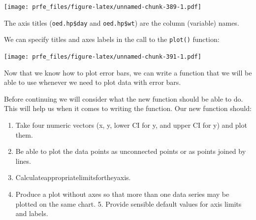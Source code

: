 \documentclass[12pt,]{book}
\newenvironment{Shaded}{\begin{snugshade}}{\end{snugshade}}
\newcommand{\KeywordTok}[1]{\textcolor[rgb]{0.13,0.29,0.53}{\textbf{#1}}}
\newcommand{\DataTypeTok}[1]{\textcolor[rgb]{0.13,0.29,0.53}{#1}}
\newcommand{\DecValTok}[1]{\textcolor[rgb]{0.00,0.00,0.81}{#1}}
\newcommand{\FloatTok}[1]{\textcolor[rgb]{0.00,0.00,0.81}{#1}}
\newcommand{\StringTok}[1]{\textcolor[rgb]{0.31,0.60,0.02}{#1}}
\newcommand{\OperatorTok}[1]{\textcolor[rgb]{0.81,0.36,0.00}{\textbf{#1}}}
\newcommand{\NormalTok}[1]{#1}
\theoremstyle{definition}
\theoremstyle{definition}
\theoremstyle{definition}
\theoremstyle{remark}
\begin{document}
\texttt{[image: prfe\_files/figure-latex/unnamed-chunk-389-1.pdf]}

The axis titles (\texttt{oed.hp\$day} and \texttt{oed.hp\$wt}) are the
column (variable) names.

We can specify titles and axes labels in the call to the \texttt{plot()}
function:

\begin{Shaded}
\end{Shaded}

\texttt{[image: prfe\_files/figure-latex/unnamed-chunk-391-1.pdf]}

Now that we know how to plot error bars, we can write a function that we
will be able to use whenever we need to plot data with error bars.

Before continuing we will consider what the new function should be able
to do. This will help us when it comes to writing the function. Our new
function should:

\begin{enumerate}
\def\labelenumi{\arabic{enumi}.}
\item
  Take four numeric vectors (x, y, lower CI for y, and upper CI for y)
  and plot them.
\item
  Be able to plot the data points as unconnected points or as points
  joined by lines.
\item
  Calculateappropriatelimitsfortheyaxis.
\item
  Produce a plot without axes so that more than one data series may be
  plotted on the same chart. 5. Provide sensible default values for axis
  limits and labels.
\end{enumerate}
\end{document}

